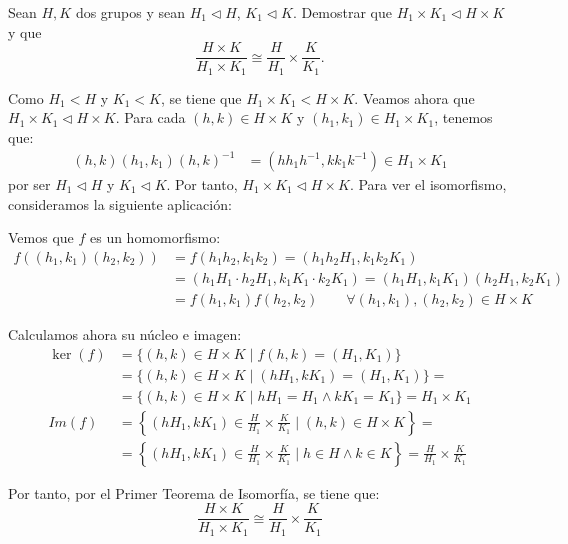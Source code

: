 \begin{ejercicio}
    Sean $H,K$ dos grupos y sean $H_1\lhd H$, $K_1\lhd K$. Demostrar que $H_1\times K_1\lhd H\times K$ y que
    \[
        \frac{H\times K}{H_1\times K_1}\cong \frac{H}{H_1}\times \frac{K}{K_1}.
    \]

    Como $H_1<H$ y $K_1<K$, se tiene que $H_1\times K_1<H\times K$. Veamos ahora que $H_1\times K_1\lhd H\times K$. Para cada $(h,k)\in H\times K$ y $(h_1,k_1)\in H_1\times K_1$, tenemos que:
    \begin{align*}
        (h,k)(h_1,k_1)(h,k)^{-1} &= (hh_1h^{-1},kk_1k^{-1})\in H_1\times K_1
    \end{align*}
    por ser $H_1\lhd H$ y $K_1\lhd K$. Por tanto, $H_1\times K_1\lhd H\times K$. Para ver el isomorfismo, consideramos la siguiente aplicación:

    Vemos que $f$ es un homomorfismo:
    \begin{align*}
        f((h_1,k_1)(h_2,k_2)) &= f(h_1h_2,k_1k_2) = (h_1h_2H_1,k_1k_2K_1)\\
        &= (h_1H_1\cdot h_2H_1,k_1K_1\cdot k_2K_1) = (h_1H_1,k_1K_1)(h_2H_1,k_2K_1)\\
        &= f(h_1,k_1)f(h_2,k_2)\qquad \forall (h_1,k_1),(h_2,k_2)\in H\times K
    \end{align*}

    Calculamos ahora su núcleo e imagen:
    \begin{align*}
        \ker(f) &= \{(h,k)\in H\times K\mid f(h,k)=(H_1,K_1)\}\\
        &= \{(h,k)\in H\times K\mid (hH_1,kK_1)=(H_1,K_1)\} =\\&= \{(h,k)\in H\times K\mid hH_1=H_1\wedge kK_1=K_1\} =  H_1\times K_1\\
        Im(f) &= \left\{(hH_1,kK_1)\in \frac{H}{H_1}\times \frac{K}{K_1}\mid (h,k)\in H\times K\right\} =\\&= \left\{(hH_1,kK_1)\in \frac{H}{H_1}\times \frac{K}{K_1}\mid h\in H\wedge k\in K\right\} = \frac{H}{H_1}\times \frac{K}{K_1}
    \end{align*}

    Por tanto, por el Primer Teorema de Isomorfía, se tiene que:
    \begin{equation*}
        \frac{H\times K}{H_1\times K_1}\cong \frac{H}{H_1}\times \frac{K}{K_1}
    \end{equation*}
\end{ejercicio}

